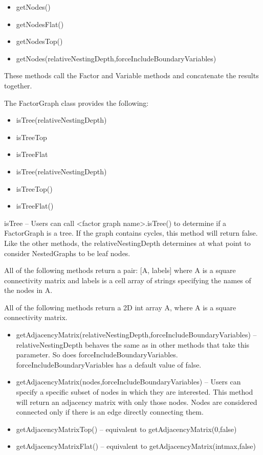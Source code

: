 \ifjava
\begin{itemize}
\item getNodes()
\item getNodesFlat()
\item getNodesTop()
\item getNodes(relativeNestingDepth,forceIncludeBoundaryVariables)
\end{itemize}
\fi

These methods call the Factor and Variable methods and concatenate the results together.


The FactorGraph class provides the following:

\ifmatlab
\begin{itemize}
\item isTree(relativeNestingDepth) 
\item isTreeTop 
\item isTreeFlat 
\end{itemize}
\fi

\ifjava
\begin{itemize}
\item isTree(relativeNestingDepth) 
\item isTreeTop()
\item isTreeFlat()
\end{itemize}
\fi


isTree -- Users can call \textless factor graph name\textgreater .isTree() to determine if a FactorGraph is a tree.  If the graph contains cycles, this method will return false. Like the other methods, the relativeNestingDepth determines at what point to consider NestedGraphs to be leaf nodes.  


\ifmatlab
All of the following methods return a pair: [A, labels] where A is a square connectivity matrix and labels is a cell array of strings specifying the names of the nodes in A. 
\fi

\ifjava
All of the following methods return a 2D int array A, where A is a square connectivity matrix.
\fi


\begin{itemize}
\item getAdjacencyMatrix(relativeNestingDepth,forceIncludeBoundaryVariables) -- relativeNestingDepth behaves the same as in other methods that take this parameter.  So does forceIncludeBoundaryVariables. forceIncludeBoundaryVariables has a default value of false.
\item getAdjacencyMatrix(nodes,forceIncludeBoundaryVariables) -- Users can specify a specific subset of nodes in which they are interested.  This method will return an adjacency matrix with only those nodes.  Nodes are considered connected only if there is an edge directly connecting them.
\item getAdjacencyMatrixTop() -- equivalent to getAdjacencyMatrix(0,false)
\item getAdjacencyMatrixFlat() -- equivalent to getAdjacencyMatrix(intmax,false)
\end{itemize}

